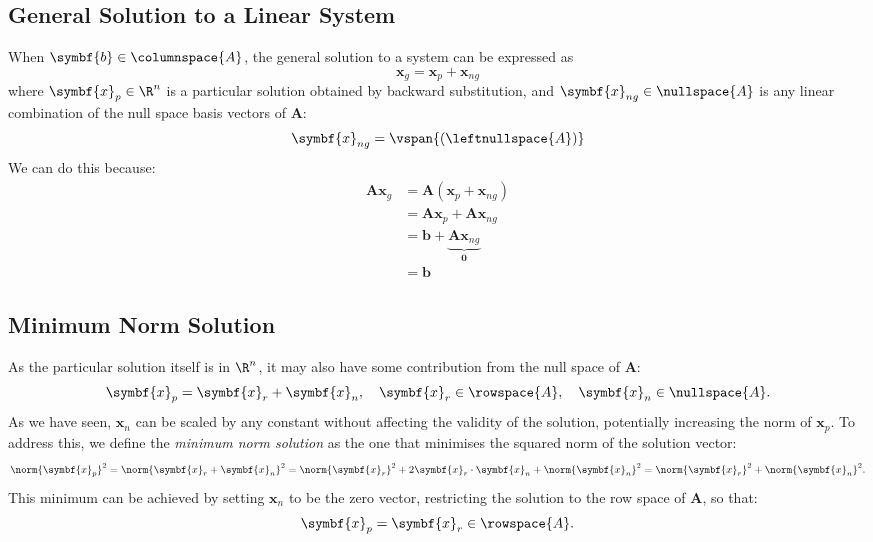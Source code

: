 \documentclass{article}
\begin{document}
\subsection{General Solution to a Linear System}
When \(\symbf{b} \in \columnspace{A}\), the general solution to a
system can be expressed as
\begin{equation*}
    \symbf{x}_g = \symbf{x}_p + \symbf{x}_{ng}
\end{equation*}
where \(\symbf{x}_p \in \R^n\) is a particular solution obtained by
backward substitution, and \(\symbf{x}_{ng} \in \nullspace{A}\) is any
linear combination of the null space basis vectors of
\(\symbf{A}\):
\begin{equation*}
    \symbf{x}_{ng} = \vspan{\left( \leftnullspace{A} \right)}
\end{equation*}
We can do this because:
\begin{align*}
    \symbf{A} \symbf{x}_g & = \symbf{A} \left( \symbf{x}_p + \symbf{x}_{ng} \right)         \\
                          & = \symbf{A} \symbf{x}_p + \symbf{A} \symbf{x}_{ng}              \\
                          & = \symbf{b} + \underbrace{\symbf{A} \symbf{x}_{ng}}_{\symbf{0}} \\
                          & = \symbf{b}
\end{align*}
\subsection{Minimum Norm Solution}
As the particular solution itself is in \(\R^n\), it may also have some
contribution from the null space of \( \symbf{A}\):
\begin{equation*}
    \symbf{x}_p = \symbf{x}_r + \symbf{x}_n, \quad \symbf{x}_r \in \rowspace{A}, \quad \symbf{x}_n \in \nullspace{A}.
\end{equation*}
As we have seen, \(\symbf{x}_n\) can be scaled by any constant without
affecting the validity of the solution, potentially increasing the norm
of \(\symbf{x}_p\). To address this, we define the \textit{minimum norm
    solution} as the one that minimises the squared norm of the solution vector:
\begin{equation*}
    \norm{\symbf{x}_p}^2 = \norm{\symbf{x}_r + \symbf{x}_n}^2 = \norm{\symbf{x}_r}^2 + 2 \symbf{x}_r \cdot \symbf{x}_n + \norm{\symbf{x}_n}^2 = \norm{\symbf{x}_r}^2 + \norm{\symbf{x}_n}^2.
\end{equation*}
This minimum can be achieved by setting \(\symbf{x}_n\) to be the
zero vector, restricting the solution to the row space of \(\symbf{A}\),
so that:
\begin{equation*}
    \symbf{x}_p = \symbf{x}_r \in \rowspace{A}.
\end{equation*}
\end{document}

